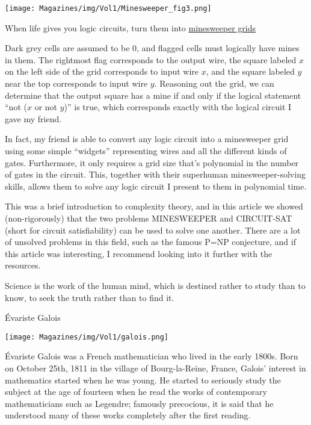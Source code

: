 \documentclass{article}
\begin{document}
\begin{multicols}{3}
{\begin{center}
    \texttt{[image: Magazines/img/Vol1/Minesweeper\_fig3.png]}
    
    {\small When life gives you logic circuits, turn them into \href{http://www.formauri.es/personal/pgimeno/compurec/Minesweeper.php}{minesweeper grids}}
\end{center}

Dark grey cells are assumed to be 0, and flagged cells must logically have mines in them. The rightmost flag corresponds to the output wire, the square labeled $x$ on the left side of the grid corresponds to input wire $x$, and the square labeled $y$ near the top corresponds to input wire $y$. Reasoning out the grid, we can determine that the output square has a mine if and only if the logical statement “not ($x$ or not $y$)” is true, which corresponds exactly with the logical circuit I gave my friend.

In fact, my friend is able to convert any logic circuit into a minesweeper grid using some simple “widgets” representing wires and all the different kinds of gates. Furthermore, it only requires a grid size that’s polynomial in the number of gates in the circuit. This, together with their superhuman minesweeper-solving skills, allows them to solve any logic circuit I present to them in polynomial time.



This was a brief introduction to complexity theory, and in this article we showed (non-rigorously) that the two problems MINESWEEPER and CIRCUIT-SAT (short for circuit satisfiability) can be used to solve one another. There are a lot of unsolved problems in this field, such as the famous P=NP conjecture, and if this article was interesting, I recommend looking into it further with the resources.
}
\closearticle



\epigraph{Science is the work of the human mind, which is destined rather to study than to know, to seek the truth rather than to find it.}{\'Evariste Galois}

\begin{center}
    \texttt{[image: Magazines/img/Vol1/galois.png]}
\end{center}

Évariste Galois was a French mathematician who lived in the early 1800s. Born on October 25th, 1811 in the village of Bourg-la-Reine, France, Galois’ interest in mathematics started when he was young. He started to seriously study the subject at the age of fourteen when he read the works of contemporary mathematicians such as Legendre; famously precocious, it is said that he understood many of these works completely after the first reading. 


\end{multicols}
\end{document}
